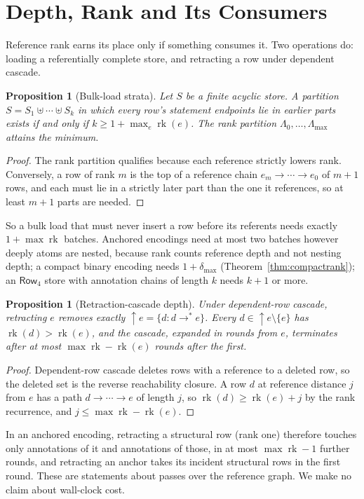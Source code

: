 \documentclass[11pt]{article}
\theoremstyle{plain}
\newtheorem{proposition}[theorem]{Proposition}
\theoremstyle{definition}
\theoremstyle{remark}
\newcommand{\rk}{\operatorname{rk}}
\newcommand{\NF}[1]{\mathsf{Row}_{#1}}
\begin{document}
\section{Depth, Rank and Its Consumers}\label{sec:depth}
Reference rank earns its place only if something consumes it. Two operations do: loading
a referentially complete store, and retracting a row under dependent cascade.
\begin{proposition}[Bulk-load strata]\label{prop:strata}
Let $S$ be a finite acyclic store. A partition $S=S_1\uplus\cdots\uplus S_k$ in which every
row's statement endpoints lie in earlier parts exists if and only if
$k\ge 1+\max_{e}\rk(e)$. The rank partition $\Lambda_0,\ldots,\Lambda_{\max}$ attains the
minimum.
\end{proposition}
\begin{proof}
The rank partition qualifies because each reference strictly lowers rank. Conversely, a
row of rank $m$ is the top of a reference chain $e_m\to\cdots\to e_0$ of $m+1$ rows, and each
must lie in a strictly later part than the one it references, so at least $m+1$ parts are
needed.
\end{proof}
So a bulk load that must never insert a row before its referents needs exactly
$1+\max\rk$ batches. Anchored encodings need at most two batches however deeply atoms are
nested, because rank counts reference depth and not nesting depth; a compact binary
encoding needs $1+\delta_{\max}$ (Theorem~\ref{thm:compactrank}); an $\NF4$ store with
annotation chains of length $k$ needs $k+1$ or more.
\begin{proposition}[Retraction-cascade depth]\label{prop:cascade}
Under dependent-row cascade, retracting $e$ removes exactly $\uparrow e=\{d:d\to^{*}e\}$.
Every $d\in\uparrow e\setminus\{e\}$ has $\rk(d)>\rk(e)$, and the cascade, expanded in
rounds from $e$, terminates after at most $\max\rk-\rk(e)$ rounds after the first.
\end{proposition}
\begin{proof}
Dependent-row cascade deletes rows with a reference to a deleted row, so the deleted set is
the reverse reachability closure. A row $d$ at reference distance $j$ from $e$ has a path
$d\to\cdots\to e$ of length $j$, so $\rk(d)\ge\rk(e)+j$ by the rank recurrence, and
$j\le\max\rk-\rk(e)$.
\end{proof}
In an anchored encoding, retracting a structural row (rank one) therefore touches only
annotations of it and annotations of those, in at most $\max\rk-1$ further rounds, and
retracting an anchor takes its incident structural rows in the first round. These are
statements about passes over the reference graph. We make no claim about wall-clock cost.
\end{document}
